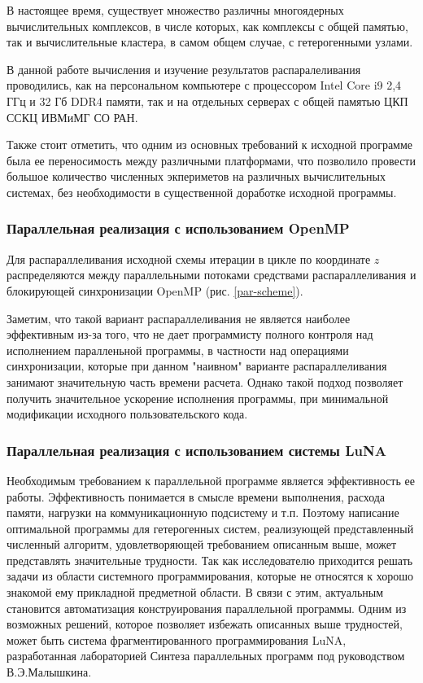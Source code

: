 В настоящее время, существует множество различны многоядерных вычислительных комплексов, в числе которых, как комплексы с общей памятью,
так и вычислительные кластера, в самом общем случае, с гетерогенными узлами.

В данной работе вычисления и изучение результатов распаралеливания проводились, как на персональном компьютере с процессором Intel Core i9 2,4 ГГц и
32 Гб DDR4 памяти, так и на отдельных серверах с общей памятью ЦКП ССКЦ ИВМиМГ СО РАН.

Также стоит отметить, что одним из основных требований к исходной программе была ее переносимость между различными платформами,
что позволило провести большое количество численных экпериметов на различных вычислительных системах,
без необходимости в существенной доработке исходной программы.

\subsubsection{Параллельная реализация с использованием OpenMP}

Для распараллеливания исходной схемы итерации в цикле по координате $z$ распределяются между параллельными потоками средствами распараллеливания и блокирующей синхронизации OpenMP (рис. \ref{par-scheme}).

Заметим, что такой вариант распараллеливания не является наиболее эффективным из-за того, что не дает программисту полного контроля
над исполнением паралленьной программы, в частности над операциями синхронизации, которые при данном "наивном" варианте распараллеливания
занимают значительную часть времени расчета. Однако такой подход позволяет получить значительное ускорение исполнения программы,
при минимальной модификации исходного пользовательского кода.


\subsubsection{Параллельная реализация с использованием системы LuNA}

Необходимым требованием к параллельной программе является эффективность ее работы. Эффективность понимается в смысле времени выполнения,
расхода памяти, нагрузки на коммуникационную подсистему и т.п.
Поэтому написание оптимальной программы для гетерогенных систем, реализующей представленный численный алгоритм,
удовлетворяющей требованием описанным выше, может представлять значительные трудности.
Так как исследователю приходится решать задачи из области системного программирования,
которые не относятся к хорошо знакомой ему прикладной предметной области.
В связи с этим, актуальным становится автоматизация конструирования параллельной программы.
Одним из возможных решений, которое позволяет избежать описанных выше трудностей, может быть система фрагментированного программирования LuNA,
разработанная лабораторией Синтеза параллельных программ под руководством В.Э.Малышкина.


